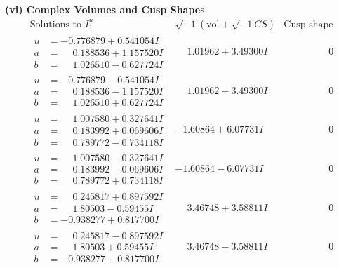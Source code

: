 \documentclass[1p]{elsarticle_modified}
\theoremstyle{definition}
\newcommand{\I}{\sqrt{-1}}
\begin{document}
\newpage\flushleft \textbf{(vi) Complex Volumes and Cusp Shapes}
$$\begin{array}{c|c|c}  
\text{Solutions to }I^u_{1}& \I (\text{vol} + \sqrt{-1}CS) & \text{Cusp shape}\\
 \hline 
\begin{aligned}
u &= -0.776879 + 0.541054 I \\
a &= \phantom{-}0.188536 + 1.157520 I \\
b &= \phantom{-}1.026510 - 0.627724 I\end{aligned}
 & \phantom{-}1.01962 + 3.49300 I & \phantom{-0.000000 } 0 \\ \hline\begin{aligned}
u &= -0.776879 - 0.541054 I \\
a &= \phantom{-}0.188536 - 1.157520 I \\
b &= \phantom{-}1.026510 + 0.627724 I\end{aligned}
 & \phantom{-}1.01962 - 3.49300 I & \phantom{-0.000000 } 0 \\ \hline\begin{aligned}
u &= \phantom{-}1.007580 + 0.327641 I \\
a &= \phantom{-}0.183992 + 0.069606 I \\
b &= \phantom{-}0.789772 - 0.734118 I\end{aligned}
 & -1.60864 + 6.07731 I & \phantom{-0.000000 } 0 \\ \hline\begin{aligned}
u &= \phantom{-}1.007580 - 0.327641 I \\
a &= \phantom{-}0.183992 - 0.069606 I \\
b &= \phantom{-}0.789772 + 0.734118 I\end{aligned}
 & -1.60864 - 6.07731 I & \phantom{-0.000000 } 0 \\ \hline\begin{aligned}
u &= \phantom{-}0.245817 + 0.897592 I \\
a &= \phantom{-}1.80503 - 0.59455 I \\
b &= -0.938277 + 0.817700 I\end{aligned}
 & \phantom{-}3.46748 + 3.58811 I & \phantom{-0.000000 } 0 \\ \hline\begin{aligned}
u &= \phantom{-}0.245817 - 0.897592 I \\
a &= \phantom{-}1.80503 + 0.59455 I \\
b &= -0.938277 - 0.817700 I\end{aligned}
 & \phantom{-}3.46748 - 3.58811 I & \phantom{-0.000000 } 0 \\ \hline\begin{aligned}

\end{aligned}
\end{array}$$
\end{document}
